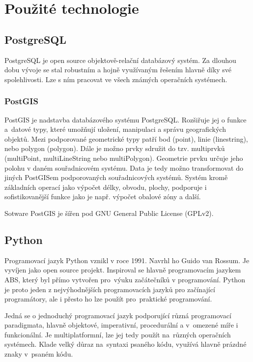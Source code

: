 \chapter{Použité technologie}
\label{3-technologie}

\section{PostgreSQL}
\label{PostgreSQL}

PostgreSQL je open source objektově-relační databázový systém. Za dlouhou dobu vývoje se stal robustním a hojně využívaným řešením hlavně díky své spolehlivosti. Lze s ním pracovat ve všech známých operačních systémech. 
\cite{PostgreSQL}

\subsection{PostGIS}
\label{PostGIS}
PostGIS je nadstavba databázového systému PostgreSQL.
Rozšiřuje jej o funkce a~datové typy, které umožňují uložení, manipulaci a správu geografických objektů. Mezi podporované geometrické typy patří bod (point), linie (linestring),
nebo polygon (polygon). Dále je možno prvky sdružit 
do tzv. multiprvků (multiPoint, multiLineString nebo multiPolygon). Geometrie prvku určuje
jeho polohu v daném souřadnicovém systému. Data je tedy možno transformovat do jiných PostGISem podporovaných souřadnicových systémů. Systém kromě základních operací jako výpočet délky, obvodu, plochy, podporuje i sofistikovanější funkce jako je např. výpočet obalové zóny a další.

Sotware PostGIS je šířen pod GNU General Public License (GPLv2).

\section{Python}
\label{Python}
Programovací jazyk Python vznikl v roce 1991. Navrhl ho Guido van
Rossum. Je vyvíjen jako open source projekt. Inspiroval se hlavně
programovacím jazykem ABS, který byl přímo vytvořen pro~výuku 
začátečníků v programování. Python je proto jeden z nejvýhodnějších
programovacích jazyků pro začínající programátory, ale i přesto ho lze
použít pro~praktické programování.

Jedná se o jednoduchý programovací jazyk podporující různá
programovací paradigmata, hlavně objektové, imperativní, procedurální
a v~omezené míře i funkcionální. Je multiplatformní, lze jej tedy
použít na~různých operačních systémech. Klade velký důraz na~syntaxi 
psaného kódu, využívá hlavně prázdné znaky v~psaném kódu.

